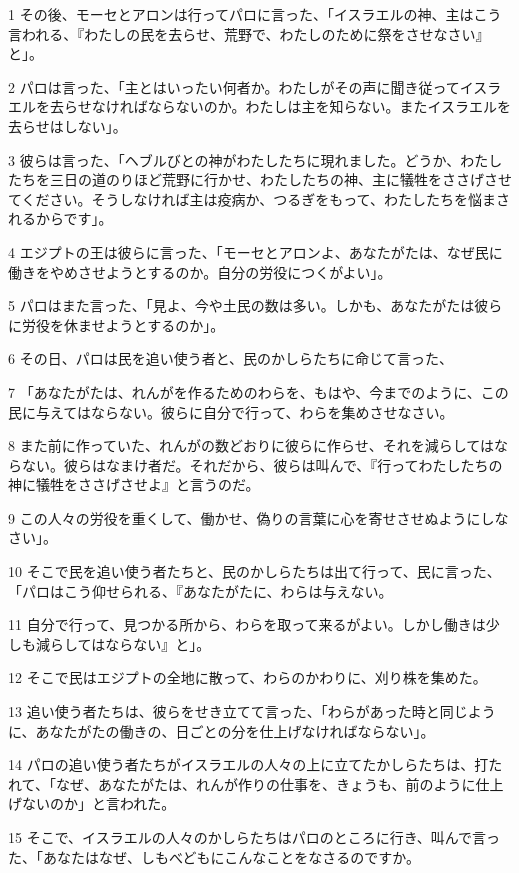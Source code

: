 \par 1 その後、モーセとアロンは行ってパロに言った、「イスラエルの神、主はこう言われる、『わたしの民を去らせ、荒野で、わたしのために祭をさせなさい』と」。
\par 2 パロは言った、「主とはいったい何者か。わたしがその声に聞き従ってイスラエルを去らせなければならないのか。わたしは主を知らない。またイスラエルを去らせはしない」。
\par 3 彼らは言った、「ヘブルびとの神がわたしたちに現れました。どうか、わたしたちを三日の道のりほど荒野に行かせ、わたしたちの神、主に犠牲をささげさせてください。そうしなければ主は疫病か、つるぎをもって、わたしたちを悩まされるからです」。
\par 4 エジプトの王は彼らに言った、「モーセとアロンよ、あなたがたは、なぜ民に働きをやめさせようとするのか。自分の労役につくがよい」。
\par 5 パロはまた言った、「見よ、今や土民の数は多い。しかも、あなたがたは彼らに労役を休ませようとするのか」。
\par 6 その日、パロは民を追い使う者と、民のかしらたちに命じて言った、
\par 7 「あなたがたは、れんがを作るためのわらを、もはや、今までのように、この民に与えてはならない。彼らに自分で行って、わらを集めさせなさい。
\par 8 また前に作っていた、れんがの数どおりに彼らに作らせ、それを減らしてはならない。彼らはなまけ者だ。それだから、彼らは叫んで、『行ってわたしたちの神に犠牲をささげさせよ』と言うのだ。
\par 9 この人々の労役を重くして、働かせ、偽りの言葉に心を寄せさせぬようにしなさい」。
\par 10 そこで民を追い使う者たちと、民のかしらたちは出て行って、民に言った、「パロはこう仰せられる、『あなたがたに、わらは与えない。
\par 11 自分で行って、見つかる所から、わらを取って来るがよい。しかし働きは少しも減らしてはならない』と」。
\par 12 そこで民はエジプトの全地に散って、わらのかわりに、刈り株を集めた。
\par 13 追い使う者たちは、彼らをせき立てて言った、「わらがあった時と同じように、あなたがたの働きの、日ごとの分を仕上げなければならない」。
\par 14 パロの追い使う者たちがイスラエルの人々の上に立てたかしらたちは、打たれて、「なぜ、あなたがたは、れんが作りの仕事を、きょうも、前のように仕上げないのか」と言われた。
\par 15 そこで、イスラエルの人々のかしらたちはパロのところに行き、叫んで言った、「あなたはなぜ、しもべどもにこんなことをなさるのですか。
